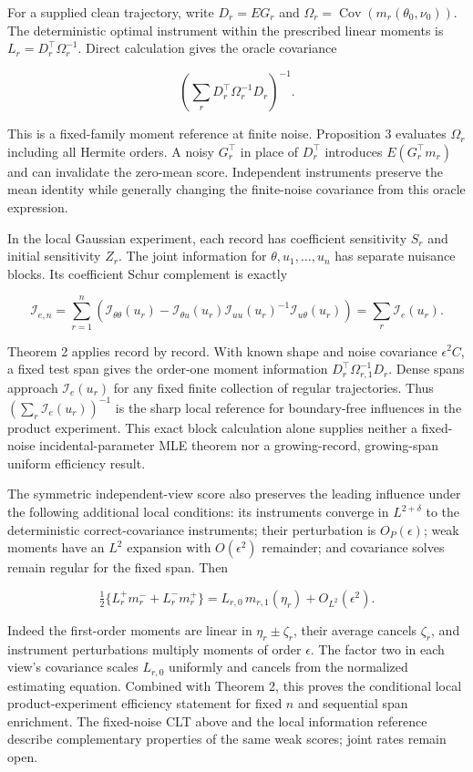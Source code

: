 \documentclass[
  american,
  11pt,
]{article}
\begin{document}
For a supplied clean trajectory, write \(D_r=E G_r\) and
\(\Omega_r=\operatorname{Cov}(m_r(\theta_0,\nu_0))\). The deterministic
optimal instrument within the prescribed linear moments is
\(L_r=D_r^\top\Omega_r^{-1}\). Direct calculation gives the oracle
covariance

\[
\left(\sum_r D_r^\top\Omega_r^{-1}D_r\right)^{-1}.
\]

This is a fixed-family moment reference at finite noise. Proposition 3
evaluates \(\Omega_r\) including all Hermite orders. A noisy
\(G_r^\top\) in place of \(D_r^\top\) introduces \(E(G_r^\top m_r)\) and
can invalidate the zero-mean score. Independent instruments preserve the
mean identity while generally changing the finite-noise covariance from
this oracle expression.

In the local Gaussian experiment, each record has coefficient
sensitivity \(S_r\) and initial sensitivity \(Z_r\). The joint
information for \(\theta,u_1,\ldots,u_n\) has separate nuisance blocks.
Its coefficient Schur complement is exactly

\[
\mathcal I_{e,n}=\sum_{r=1}^n
\left(\mathcal I_{\theta\theta}(u_r)-
\mathcal I_{\theta u}(u_r)\mathcal I_{uu}(u_r)^{-1}
\mathcal I_{u\theta}(u_r)\right)
=\sum_r\mathcal I_e(u_r).
\]

Theorem 2 applies record by record. With known shape and noise
covariance \(\epsilon^2 C\), a fixed test span gives the order-one
moment information \(D_r^\top\Omega_{r,1}^{-1}D_r\). Dense spans
approach \(\mathcal I_e(u_r)\) for any fixed finite collection of
regular trajectories. Thus \((\sum_r\mathcal I_e(u_r))^{-1}\) is the
sharp local reference for boundary-free influences in the product
experiment. This exact block calculation alone supplies neither a
fixed-noise incidental-parameter MLE theorem nor a growing-record,
growing-span uniform efficiency result.

The symmetric independent-view score also preserves the leading
influence under the following additional local conditions: its
instruments converge in \(L^{2+\delta}\) to the deterministic
correct-covariance instruments; their perturbation is \(O_P(\epsilon)\);
weak moments have an \(L^2\) expansion with \(O(\epsilon^2)\) remainder;
and covariance solves remain regular for the fixed span. Then

\[
\tfrac12\{L_r^+m_r^-+L_r^-m_r^+\}
=L_{r,0}\,m_{r,1}(\eta_r)+O_{L^2}(\epsilon^2).
\]

Indeed the first-order moments are linear in \(\eta_r\pm\zeta_r\), their
average cancels \(\zeta_r\), and instrument perturbations multiply
moments of order \(\epsilon\). The factor two in each view's covariance
scales \(L_{r,0}\) uniformly and cancels from the normalized estimating
equation. Combined with Theorem 2, this proves the conditional local
product-experiment efficiency statement for fixed \(n\) and sequential
span enrichment. The fixed-noise CLT above and the local information
reference describe complementary properties of the same weak scores;
joint rates remain open.
\end{document}
